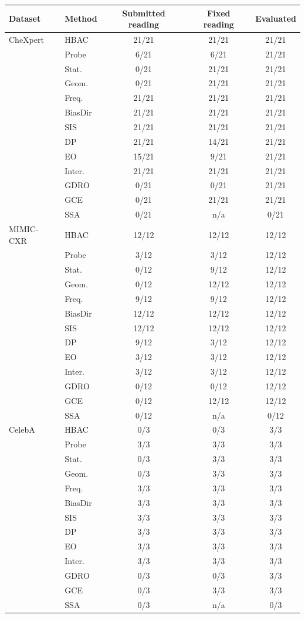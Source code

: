 \begin{tabular}{llccc}
\toprule
Dataset & Method & Submitted reading & Fixed reading & Evaluated \\
\midrule
CheXpert & HBAC & 21/21 & 21/21 & 21/21 \\
 & Probe & 6/21 & 6/21 & 21/21 \\
 & Stat. & 0/21 & 21/21 & 21/21 \\
 & Geom. & 0/21 & 21/21 & 21/21 \\
 & Freq. & 21/21 & 21/21 & 21/21 \\
 & BiasDir & 21/21 & 21/21 & 21/21 \\
 & SIS & 21/21 & 21/21 & 21/21 \\
 & DP & 21/21 & 14/21 & 21/21 \\
 & EO & 15/21 & 9/21 & 21/21 \\
 & Inter. & 21/21 & 21/21 & 21/21 \\
 & GDRO & 0/21 & 0/21 & 21/21 \\
 & GCE & 0/21 & 21/21 & 21/21 \\
 & SSA & 0/21 & n/a & 0/21 \\
\midrule
MIMIC-CXR & HBAC & 12/12 & 12/12 & 12/12 \\
 & Probe & 3/12 & 3/12 & 12/12 \\
 & Stat. & 0/12 & 9/12 & 12/12 \\
 & Geom. & 0/12 & 12/12 & 12/12 \\
 & Freq. & 9/12 & 9/12 & 12/12 \\
 & BiasDir & 12/12 & 12/12 & 12/12 \\
 & SIS & 12/12 & 12/12 & 12/12 \\
 & DP & 9/12 & 3/12 & 12/12 \\
 & EO & 3/12 & 3/12 & 12/12 \\
 & Inter. & 3/12 & 3/12 & 12/12 \\
 & GDRO & 0/12 & 0/12 & 12/12 \\
 & GCE & 0/12 & 12/12 & 12/12 \\
 & SSA & 0/12 & n/a & 0/12 \\
\midrule
CelebA & HBAC & 0/3 & 0/3 & 3/3 \\
 & Probe & 3/3 & 3/3 & 3/3 \\
 & Stat. & 0/3 & 3/3 & 3/3 \\
 & Geom. & 0/3 & 3/3 & 3/3 \\
 & Freq. & 3/3 & 3/3 & 3/3 \\
 & BiasDir & 3/3 & 3/3 & 3/3 \\
 & SIS & 3/3 & 3/3 & 3/3 \\
 & DP & 3/3 & 3/3 & 3/3 \\
 & EO & 3/3 & 3/3 & 3/3 \\
 & Inter. & 3/3 & 3/3 & 3/3 \\
 & GDRO & 0/3 & 0/3 & 3/3 \\
 & GCE & 0/3 & 3/3 & 3/3 \\
 & SSA & 0/3 & n/a & 0/3 \\
\bottomrule
\end{tabular}
